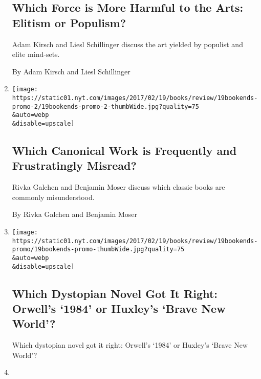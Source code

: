 \begin{enumerate}
  \hypertarget{which-force-is-more-harmful-to-the-arts-elitism-or-populism}{%
  \subsection{Which Force is More Harmful to the Arts: Elitism or
  Populism?}\label{which-force-is-more-harmful-to-the-arts-elitism-or-populism}}

  Adam Kirsch and Liesl Schillinger discuss the art yielded by populist
  and elite mind-sets.

  By Adam Kirsch and Liesl Schillinger
\item
  \href{/2017/02/17/books/review/which-canonical-work-is-frequently-and-frustratingly-misread.html}{}

  \texttt{[image: https://static01.nyt.com/images/2017/02/19/books/review/19bookends-promo-2/19bookends-promo-2-thumbWide.jpg?quality=75\\\&auto=webp\\\&disable=upscale]}

  \hypertarget{which-canonical-work-is-frequently-and-frustratingly-misread}{%
  \subsection{Which Canonical Work is Frequently and Frustratingly
  Misread?}\label{which-canonical-work-is-frequently-and-frustratingly-misread}}

  Rivka Galchen and Benjamin Moser discuss which classic books are
  commonly misunderstood.

  By Rivka Galchen and Benjamin Moser
\item
  \href{/2017/02/13/books/review/which-dystopian-novel-got-it-right-orwells-1984-or-huxleys-brave-new-world.html}{}

  \texttt{[image: https://static01.nyt.com/images/2017/02/19/books/review/19bookends-promo/19bookends-promo-thumbWide.jpg?quality=75\\\&auto=webp\\\&disable=upscale]}

  \hypertarget{which-dystopian-novel-got-it-right-orwells-1984-or-huxleys-brave-new-world}{%
  \subsection{Which Dystopian Novel Got It Right: Orwell's `1984' or
  Huxley's `Brave New
  World'?}\label{which-dystopian-novel-got-it-right-orwells-1984-or-huxleys-brave-new-world}}

  Which dystopian novel got it right: Orwell's `1984' or Huxley's `Brave
  New World'?
\item
  \href{/2017/01/03/books/review/is-it-possible-for-a-writer-to-be-objective.html}{}


\end{enumerate}
